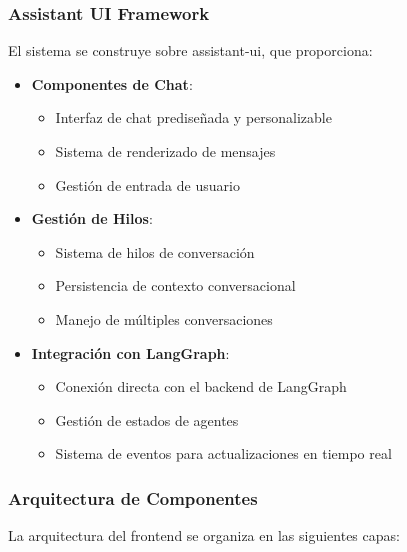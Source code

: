 \subsubsection{Assistant UI Framework}
\label{assistant-ui}

El sistema se construye sobre \gls{assistant-ui}, que proporciona:

\begin{itemize}
    \item \textbf{Componentes de Chat}:
    \begin{itemize}
        \item Interfaz de chat prediseñada y personalizable
        \item Sistema de renderizado de mensajes
        \item Gestión de entrada de usuario
    \end{itemize}

    \item \textbf{Gestión de Hilos}:
    \begin{itemize}
        \item Sistema de hilos de conversación
        \item Persistencia de contexto conversacional
        \item Manejo de múltiples conversaciones
    \end{itemize}

    \item \textbf{Integración con LangGraph}:
    \begin{itemize}
        \item Conexión directa con el backend de LangGraph
        \item Gestión de estados de agentes
        \item Sistema de eventos para actualizaciones en tiempo real
    \end{itemize}
\end{itemize}

\subsubsection{Arquitectura de Componentes}
La arquitectura del frontend se organiza en las siguientes capas:

